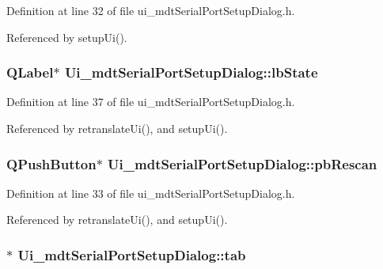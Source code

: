 Definition at line 32 of file ui\-\_\-mdt\-Serial\-Port\-Setup\-Dialog.\-h.



Referenced by setup\-Ui().

\hypertarget{class_ui__mdt_serial_port_setup_dialog_a8b460fe6e70b33cc1d5a988732bc918c}{
\subsubsection[{lb\-State}]{\setlength{\rightskip}{0pt plus 5cm}Q\-Label$\ast$ Ui\-\_\-mdt\-Serial\-Port\-Setup\-Dialog\-::lb\-State}}\label{class_ui__mdt_serial_port_setup_dialog_a8b460fe6e70b33cc1d5a988732bc918c}


Definition at line 37 of file ui\-\_\-mdt\-Serial\-Port\-Setup\-Dialog.\-h.



Referenced by retranslate\-Ui(), and setup\-Ui().

\hypertarget{class_ui__mdt_serial_port_setup_dialog_a00ab731bc8c63f64ef981783f3434c17}{
\subsubsection[{pb\-Rescan}]{\setlength{\rightskip}{0pt plus 5cm}Q\-Push\-Button$\ast$ Ui\-\_\-mdt\-Serial\-Port\-Setup\-Dialog\-::pb\-Rescan}}\label{class_ui__mdt_serial_port_setup_dialog_a00ab731bc8c63f64ef981783f3434c17}


Definition at line 33 of file ui\-\_\-mdt\-Serial\-Port\-Setup\-Dialog.\-h.



Referenced by retranslate\-Ui(), and setup\-Ui().

\hypertarget{class_ui__mdt_serial_port_setup_dialog_a2fba2d05e85b4d015d317703637d387f}{
\subsubsection[{tab}]{$\ast$ Ui\-\_\-mdt\-Serial\-Port\-Setup\-Dialog\-::tab}}\label{class_ui__mdt_serial_port_setup_dialog_a2fba2d05e85b4d015d317703637d387f}


